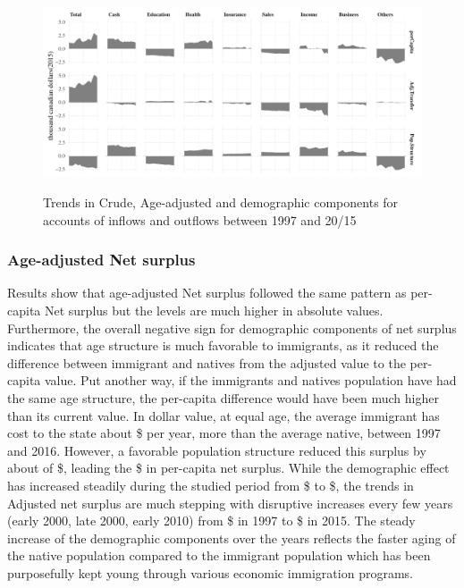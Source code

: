 \begin{figure}[H]%
  \caption{Trends in Crude, Age-adjusted and demographic components for accounts of inflows and outflows between 1997 and 20/15 }
  \includegraphics[width=1\textwidth]{res/DEcomp.pdf}%
  \label{fig:DEcomp}%
\end{figure}%

\subsubsection*{Age-adjusted Net surplus}

Results show that age-adjusted Net surplus followed the same pattern as per-capita Net surplus but the levels are much higher in absolute values.
Furthermore, the overall negative sign for demographic components of net surplus indicates that age structure is much favorable to immigrants, as it reduced the difference between immigrant and natives from the adjusted value to the per-capita value.
Put another way, if the immigrants and natives population have had the same age structure, the per-capita difference would have been much higher than its current value.
In dollar value, at equal age, the average immigrant has cost to the state about \$ per year, more than the average native, between 1997 and 2016.
However, a favorable population structure reduced this surplus by about of \$, leading the  \$ in per-capita net surplus.
While the demographic effect has increased steadily during the studied period from \$ to \$, the trends in Adjusted net surplus are much stepping with disruptive increases every few years (early 2000, late 2000, early 2010) from \$ in 1997 to \$ in 2015.
The steady increase of the demographic components over the years reflects the faster aging of the native population compared to the immigrant population which has been purposefully kept young through various economic immigration programs.

